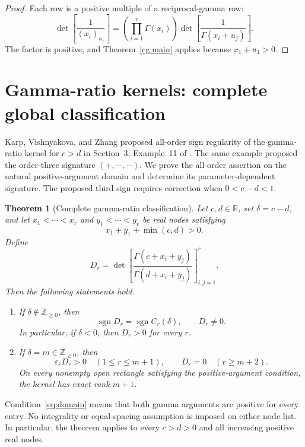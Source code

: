 \documentclass[11pt,a4paper]{article}
\newtheorem{theorem}{Theorem}[section]
\theoremstyle{definition}
\theoremstyle{remark}
\DeclareMathOperator{\sgn}{sgn}
\newcommand{\R}{\mathbb R}
\newcommand{\Z}{\mathbb Z}
\newcommand{\ep}{\varepsilon}
\begin{document}
\begin{proof}
Each row is a positive multiple of a reciprocal-gamma row:
\[
 \det\left[\frac1{(x_i)_{u_j}}\right]
 =
 \left(\prod_{i=1}^{r}\Gamma(x_i)\right)
 \det\left[\frac1{\Gamma(x_i+u_j)}\right].
\]
The factor is positive, and Theorem~\ref{cg:main} applies because
\(x_1+u_1>0\).
\end{proof}

\section{Gamma-ratio kernels: complete global classification}\label{gr:section}


Karp, Vishnyakova, and Zhang proposed all-order sign regularity of the
gamma-ratio kernel for \(c>d\) in Section~3, Example~11 of
\cite{KVZ}. The same example proposed the order-three signature
\((+,-,-)\). We prove the all-order assertion on the natural
positive-argument domain and determine its parameter-dependent signature.
The proposed third sign requires correction when \(0<c-d<1\).

\begin{theorem}[Complete gamma-ratio classification]\label{thm:main}
Let \(c,d\in\R\), set \(\delta=c-d\), and let
\(x_1<\cdots<x_r\) and \(y_1<\cdots<y_r\) be real nodes satisfying
\begin{equation}\label{eq:domain}
 x_1+y_1+\min(c,d)>0.
\end{equation}
Define
\[
 D_r=\det\left[
 \frac{\Gamma(c+x_i+y_j)}{\Gamma(d+x_i+y_j)}
 \right]_{i,j=1}^{r}.
\]
Then the following statements hold.
\begin{enumerate}[label=\textnormal{(\roman*)}]
\item If \(\delta\notin\Z_{\ge0}\), then
\begin{equation}\label{eq:classification}
 \sgn D_r=\sgn C_r(\delta),\qquad D_r\ne0.
\end{equation}
In particular, if \(\delta<0\), then \(D_r>0\) for every \(r\).
\item If \(\delta=m\in\Z_{\ge0}\), then
\begin{equation}\label{eq:integer}
 \ep_r D_r>0\quad(1\le r\le m+1),
 \qquad D_r=0\quad(r\ge m+2).
\end{equation}
On every nonempty open rectangle satisfying the positive-argument
condition, the kernel has exact rank \(m+1\).
\end{enumerate}
\end{theorem}

Condition~\eqref{eq:domain} means that both gamma arguments are positive
for every entry. No integrality or equal-spacing assumption is imposed on
either node list. In particular, the theorem applies to every
\(c>d>0\) and all increasing positive real nodes.
\end{document}
